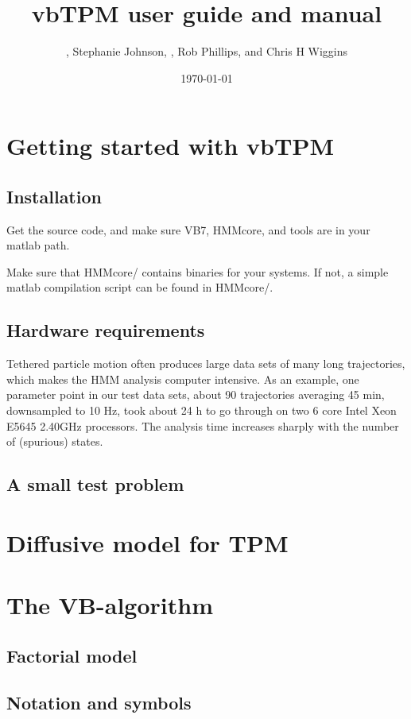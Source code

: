 \documentclass[11pt,letterpaper,twocolumn]{article}
\title{vbTPM user guide and manual}
\author{\ml{Martin Lind\'en}, Stephanie Johnson, \jwm{Jan-Willem van
    de Meent}, Rob Phillips, and Chris H Wiggins}
\date{\today}
\begin{document}
\maketitle
\tableofcontents

\section{Getting started with vbTPM}
\subsection{Installation}
Get the source code, and make sure VB7, HMMcore, and tools are in your
matlab path.

Make sure that HMMcore/ contains binaries for your systems. If not, a
simple matlab compilation script can be found in HMMcore/.

\subsection{Hardware requirements}
Tethered particle motion often produces large data sets of many long
trajectories, which makes the HMM analysis computer intensive. As an
example, one parameter point in our test data sets, about 90
trajectories averaging 45 min, downsampled to 10 Hz, took about 24 h
to go through on two 6 core Intel Xeon E5645 2.40GHz processors. The
analysis time increases sharply with the number of (spurious) states.

\subsection{A small test problem}
\section{Diffusive model for TPM}

\section{The VB-algorithm}

\subsection{Factorial model}
\subsection{Notation and symbols}
\end{document}
